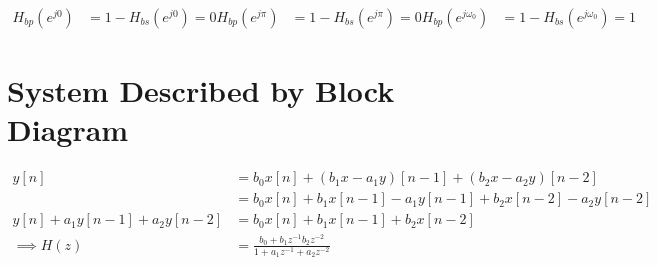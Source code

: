 \documentclass{article}
\begin{document}
\begin{align}
    H_{bp}(e^{j 0}) &= 1 - H_{bs}(e^{j 0}) = 0
    H_{bp}(e^{j \pi}) &= 1 - H_{bs}(e^{j \pi}) = 0
    H_{bp}(e^{j \omega_0}) &= 1 - H_{bs}(e^{j \omega_0}) = 1
\end{align}

\section{System Described by Block Diagram}

\begin{align}
    y[n] &= b_0 x[n] + (b_1 x - a_1 y)[n - 1] + (b_2 x - a_2 y)[n - 2] \\
    &= b_0 x[n] + b_1 x[n - 1] - a_1 y[n - 1] + b_2 x[n - 2] - a_2 y[n - 2] \\
    y[n] + a_1 y[n - 1] + a_2 y[n - 2] &= b_0 x[n] + b_1 x[n - 1] + b_2 x[n - 2] \\
    \implies H(z) &= \frac{b_0 + b_1 z^{-1} b_2 z^{-2}}{1 + a_1 z^{-1} + a_2 z^{-2}}
\end{align}
\end{document}
